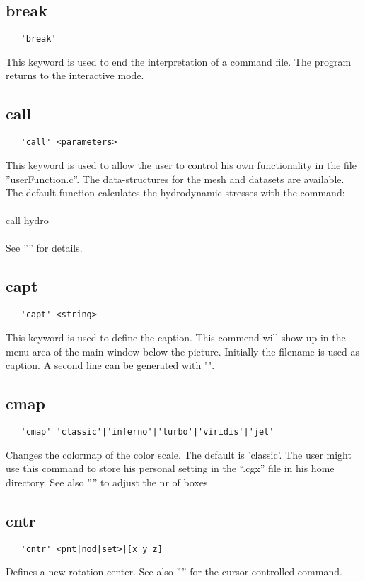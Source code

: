 \documentclass{article}
\begin{document}
\subsection{\label{break}break}
\begin{verbatim}
   'break'
\end{verbatim}
This keyword is used to end the interpretation of a command file. The program returns to the interactive mode.

\subsection{\label{call}call}
\begin{verbatim}
   'call' <parameters>
\end{verbatim}
This keyword is used to allow the user to control his own functionality in the file ''userFunction.c''. The data-structures for the mesh and datasets are available. The default function calculates the hydrodynamic stresses with the command:\\\\call hydro\\\\See '''' for  details. 

\subsection{\label{capt}capt}
\begin{verbatim}
   'capt' <string> 
\end{verbatim}
This keyword is used to define the caption. This commend will show up in the
menu area of the main window below the picture. Initially the filename is used
as caption. A second line can be generated with "".

\subsection{\label{cmap}cmap}
\begin{verbatim}
   'cmap' 'classic'|'inferno'|'turbo'|'viridis'|'jet'
\end{verbatim}
Changes the colormap of the color scale. The default is 'classic'. The user might use this command to store his personal setting in the ``.cgx'' file in his home directory. See also '''' to adjust the nr of boxes.

\subsection{\label{cntr}cntr}
\begin{verbatim}
   'cntr' <pnt|nod|set>|[x y z]
\end{verbatim}
Defines a new rotation center. See also '''' for the cursor controlled command.
\end{document}
